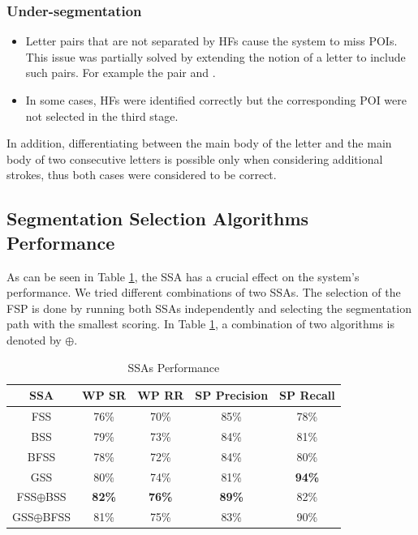 \documentclass[10pt, conference, compsocconf]{IEEEtran}
\begin{document}
\subsubsection{Under-segmentation}
\begin{itemize}
\item Letter pairs that are not separated by HFs cause the system to miss POIs. This issue was partially solved by extending the notion of a letter to include such pairs. For example the pair  and .
\item In some cases, HFs were identified correctly but the corresponding POI were not selected in the third stage. \\
\end{itemize}

In addition, differentiating between the main body of the letter  and the main body of two consecutive  letters is possible only when considering additional strokes, thus both cases were considered to be correct.

\subsection{Segmentation Selection Algorithms Performance}
\label{subsec:ssa_performance}
As can be seen in Table \ref{table:ss_algorithms_results}, the SSA has a crucial effect on the system's performance. We tried different combinations of two SSAs. The selection of the FSP is done by running both SSAs independently and selecting the segmentation path with the smallest scoring. In Table \ref{table:ss_algorithms_results}, a combination of two algorithms is denoted by $\oplus$.

\begin{table}[h]
\caption{SSAs Performance}
\renewcommand{\arraystretch}{1.2}
\begin{tabular}{ | c | c | c | c | c |}
\hline
SSA & WP SR & WP RR & SP Precision & SP Recall\\
\hline                 
  FSS & 76\% & 70\% & 85\% & 78\% \\ 
  \hline
  BSS & 79\% &  73\% & 84\%& 81\% \\
  \hline
  BFSS & 78\% & 72\% & 84\% & 80\%\\ 
  \hline
  GSS & 80\% & 74\% & 81\% & \bf{94}\% \\  
  \hline
  FSS$\oplus$BSS & \bf{82}\% & \bf{76}\% & \bf{89}\% & 82\%\\  
  \hline
  GSS$\oplus$BFSS & 81\% & 75\% & 83\% & 90\% \\
  \hline
\end{tabular}
\centering
\label{table:ss_algorithms_results} 
\end{table}
\end{document}
